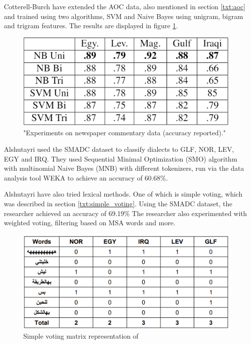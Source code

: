 \documentclass[12pt]{diazessay}
\begin{document}
        Cotterell-Burch have extended the AOC data, also mentioned in section \ref{txt:aoc} and trained using two algorithms, SVM and Naive Bayes using unigram, bigram and trigram features\cite{cotterell-callison-burch-2014-multi}. The results are displayed in figure \ref{fig:extended_aoc_results}.
        
        \begin{figure}[h]
            \includegraphics[scale=0.6]{Figures/results_extended_AOC.png}
            \caption{"Experiments on newspaper commentary data (accuracy reported)."\cite{cotterell-callison-burch-2014-multi}}
            \label{fig:extended_aoc_results}
        \end{figure}
        
        Alshutayri used the SMADC dataset to classify dialects to GLF, NOR, LEV, EGY and IRQ. They used Sequential Minimal Optimization (SMO) algorithm with multinomial Naive Bayes (MNB) with different tokenizers, run via the data analysis tool WEKA to achieve an accuracy of 60.68\%\cite{alshutayri}.
        
        Alshutayri have also tried lexical methods. One of which is simple voting, which was described in section \ref{txt:simple_voting}. Using the SMADC dataset, the researcher achieved an accuracy of 69.19\% The researcher also experimented with weighted voting, filtering based on MSA words and more\cite{alshutayri}.
        
        \begin{figure}[h]
            \includegraphics[scale=0.35]{Figures/smadc_simple_voting.png}
            \caption{Simple voting matrix representation of \cite{alshutayri}}
        \end{figure}
        
\end{document}
